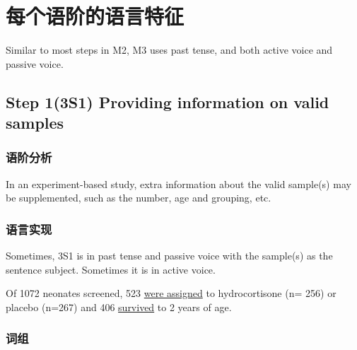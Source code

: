 \documentclass[a4paper]{ctexbook}
\begin{document}
\section{每个语阶的语言特征}

Similar to most steps in M2, M3 uses past tense, and both active voice and passive voice.

  \subsection{Step 1(3S1) Providing information on valid samples}
    \subsubsection{语阶分析}

    In an experiment-based study, extra information about the valid sample(s) may be supplemented, such as the number, age and grouping, etc.

    \subsubsection{语言实现}

    Sometimes, 3S1 is in past tense and passive voice with the sample(s) as the sentence subject. Sometimes it is in active voice.

    \begin{eg}{}
      Of 1072 neonates screened, 523 \uline{were assigned} to hydrocortisone (n= 256) or placebo (n=267) and 406 \uline{survived} to 2 years of age.  
    \end{eg}

    \subsubsection{词组}
\end{document}
